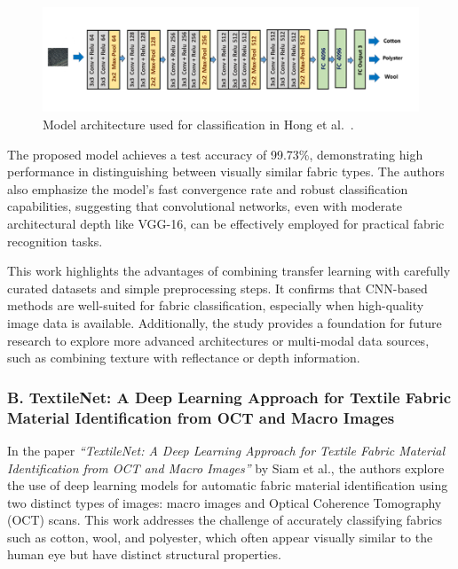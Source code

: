 \begin{figure}[H]
    \centering
    \begin{minipage}{1\linewidth}
        \includegraphics[width=\linewidth]{images/Paper1Model.png}
    \end{minipage}
    \caption[Model architecture - Hong et al.~\cite{hong2024research}]{Model architecture used for classification in Hong et al.~\cite{hong2024research}.}
\end{figure}

The proposed model achieves a test accuracy of 99.73\%, demonstrating high performance in distinguishing between visually similar fabric types. The authors also emphasize the model’s fast convergence rate and robust classification capabilities, suggesting that convolutional networks, even with moderate architectural depth like VGG-16, can be effectively employed for practical fabric recognition tasks.

This work highlights the advantages of combining transfer learning with carefully curated datasets and simple preprocessing steps. It confirms that CNN-based methods are well-suited for fabric classification, especially when high-quality image data is available. Additionally, the study provides a foundation for future research to explore more advanced architectures or multi-modal data sources, such as combining texture with reflectance or depth information.

\subsubsection{B. TextileNet: A Deep Learning Approach for Textile Fabric Material Identification from OCT and Macro Images~\cite{siam2023textilenet}}

In the paper \textit{“TextileNet: A Deep Learning Approach for Textile Fabric Material Identification from OCT and Macro Images”} by Siam et al., the authors explore the use of deep learning models for automatic fabric material identification using two distinct types of images: macro images and Optical Coherence Tomography (OCT) scans. This work addresses the challenge of accurately classifying fabrics such as cotton, wool, and polyester, which often appear visually similar to the human eye but have distinct structural properties.

